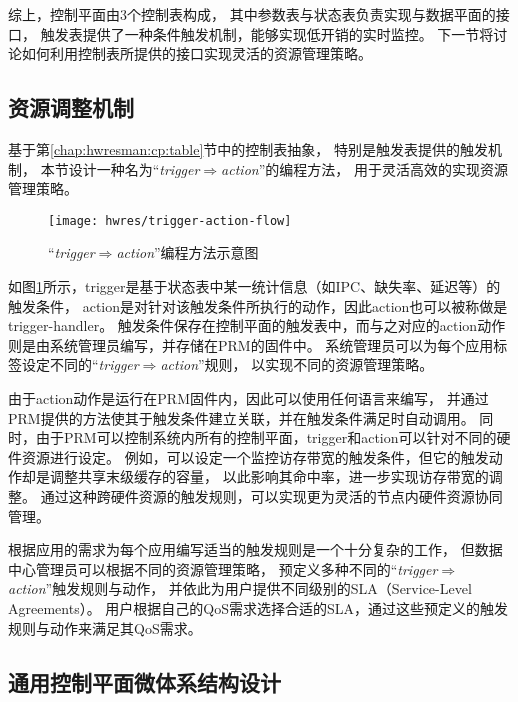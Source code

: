 综上，控制平面由3个控制表构成，
其中参数表与状态表负责实现与数据平面的接口，
触发表提供了一种条件触发机制，能够实现低开销的实时监控。
下一节将讨论如何利用控制表所提供的接口实现灵活的资源管理策略。


\subsection{资源调整机制}

基于第\ref{chap:hwresman:cp:table}节中的控制表抽象，
特别是触发表提供的触发机制，
本节设计一种名为``\emph{trigger$\Rightarrow$action}''的编程方法，
用于灵活高效的实现资源管理策略。

\begin{figure}[htb]
  \centering
  \texttt{[image: hwres/trigger-action-flow]}
  \caption{``\emph{trigger$\Rightarrow$action}''编程方法示意图}
  \label{fig:trigger-action-flow}
\end{figure}

如图\ref{fig:trigger-action-flow}所示，trigger是基于状态表中某一统计信息（如IPC、缺失率、延迟等）的触发条件，
action是对针对该触发条件所执行的动作，因此action也可以被称做是trigger-handler。
触发条件保存在控制平面的触发表中，而与之对应的action动作则是由系统管理员编写，并存储在PRM的固件中。
系统管理员可以为每个应用标签设定不同的``\emph{trigger$\Rightarrow$action}''规则，
以实现不同的资源管理策略。

由于action动作是运行在PRM固件内，因此可以使用任何语言来编写，
并通过PRM提供的方法使其于触发条件建立关联，并在触发条件满足时自动调用。
同时，由于PRM可以控制系统内所有的控制平面，trigger和action可以针对不同的硬件资源进行设定。
例如，可以设定一个监控访存带宽的触发条件，但它的触发动作却是调整共享末级缓存的容量，
以此影响其命中率，进一步实现访存带宽的调整。
通过这种跨硬件资源的触发规则，可以实现更为灵活的节点内硬件资源协同管理。

根据应用的需求为每个应用编写适当的触发规则是一个十分复杂的工作，
但数据中心管理员可以根据不同的资源管理策略，
预定义多种不同的``\emph{trigger$\Rightarrow$action}''触发规则与动作，
并依此为用户提供不同级别的SLA（Service-Level Agreements）。
用户根据自己的QoS需求选择合适的SLA，通过这些预定义的触发规则与动作来满足其QoS需求。


\subsection{通用控制平面微体系结构设计}
\label{chap:hwresman:cp:uarch}

